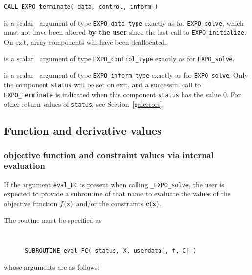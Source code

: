 \documentclass{galahad}
\newcommand{\packagename}{EXPO}
\newcommand{\fullpackagename}{\libraryname\_\packagename}
\newcommand{\solver}{{\tt \fullpackagename\_solve}}
\begin{document}
\hspace{8mm}
{\tt CALL \packagename\_terminate( data, control, inform )}

\vspace*{-1mm}
\begin{description}

 is a scalar \intentinout\ argument of type
{\tt \packagename\_data\_type}
exactly as for
{\tt \packagename\_solve},
which must not have been altered {\bf by the user} since the last call to
{\tt \packagename\_initialize}.
On exit, array components will have been deallocated.

 is a scalar \intentin\ argument of type
{\tt \packagename\_control\_type}
exactly as for
{\tt \packagename\_solve}.

 is a scalar \intentout\ argument of type
{\tt \packagename\_inform\_type}
exactly as for
{\tt \packagename\_solve}.
Only the component {\tt status} will be set on exit, and a
successful call to
{\tt \packagename\_terminate}
is indicated when this  component {\tt status} has the value 0.
For other return values of {\tt status}, see Section~\ref{galerrors}.

\end{description}


\subsection{Function and derivative values\label{fdv}}


\subsubsection{objective function and constraint values via internal evaluation\label{fcfv}}

If the argument {\tt eval\_FC} is present when calling \solver, the
user is expected to provide a subroutine of that name to evaluate the
values of the objective function $f({\mathbf{x}})$ and/or the constraints ${\mathbf{c}}({\mathbf{x}})$.

The routine must be specified as

\def\baselinestretch{0.8}
{\tt
\begin{verbatim}
      SUBROUTINE eval_FC( status, X, userdata[, f, C] )
\end{verbatim}
}
\def\baselinestretch{1.0}
\noindent whose arguments are as follows:
\end{document}
